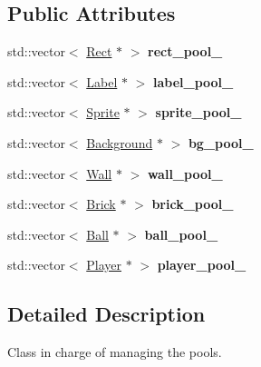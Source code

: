 \subsection*{Public Attributes}
\begin{DoxyCompactItemize}
\item 
\mbox{\label{class_pool_a2a73ee4005262cd6f4ebfc25a1811fce}} 
std\+::vector$<$ \hyperlink{class_rect}{Rect} $\ast$ $>$ {\bfseries rect\+\_\+pool\+\_\+}
\item 
\mbox{\label{class_pool_a5ea3bbd258fcb452dcfa036ac5acacd5}} 
std\+::vector$<$ \hyperlink{class_label}{Label} $\ast$ $>$ {\bfseries label\+\_\+pool\+\_\+}
\item 
\mbox{\label{class_pool_a0bd32066fb5351695261a6fa1f1796bf}} 
std\+::vector$<$ \hyperlink{class_sprite}{Sprite} $\ast$ $>$ {\bfseries sprite\+\_\+pool\+\_\+}
\item 
\mbox{\label{class_pool_a11e4e7ab2e2d9307e7ec5dd56ffc84ed}} 
std\+::vector$<$ \hyperlink{class_background}{Background} $\ast$ $>$ {\bfseries bg\+\_\+pool\+\_\+}
\item 
\mbox{\label{class_pool_abc1ff43b1ca086e39f573836c65075fe}} 
std\+::vector$<$ \hyperlink{class_wall}{Wall} $\ast$ $>$ {\bfseries wall\+\_\+pool\+\_\+}
\item 
\mbox{\label{class_pool_ac21fb5d80b85cfe7d71990cd18812039}} 
std\+::vector$<$ \hyperlink{class_brick}{Brick} $\ast$ $>$ {\bfseries brick\+\_\+pool\+\_\+}
\item 
\mbox{\label{class_pool_a965526b277fd41a49c09526b2286f144}} 
std\+::vector$<$ \hyperlink{class_ball}{Ball} $\ast$ $>$ {\bfseries ball\+\_\+pool\+\_\+}
\item 
\mbox{\label{class_pool_a915954cdebfdc2c6fe4e2cb30b426865}} 
std\+::vector$<$ \hyperlink{class_player}{Player} $\ast$ $>$ {\bfseries player\+\_\+pool\+\_\+}
\end{DoxyCompactItemize}


\subsection{Detailed Description}
Class in charge of managing the pools. 

